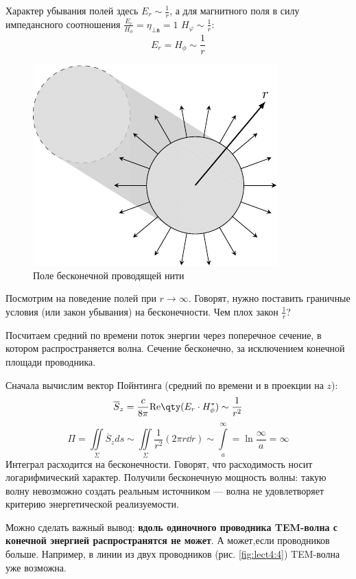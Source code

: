 Характер убывания полей здесь $E_r\sim \frac{1}{r}$, а для магнитного поля в силу импедансного соотношения $\frac{E_r}{H_\phi}=\eta_{\perp\text{в}}=1$ $H_\varphi\sim\frac{1}{r}$:
\begin{equation}
	E_r=H_\phi\sim\frac{1}{r}
\end{equation}
\begin{figure}[h!]
	\centering
	\includegraphics[scale=1.5]{img/lect4_ris3}
	\caption{Поле бесконечной проводящей нити}
	\label{fig:lect4:3}
\end{figure}

Посмотрим на поведение полей при $r\to\infty$. Говорят, нужно поставить граничные условия (или закон убывания) на бесконечности. Чем плох закон $\frac{1}{r}$?

Посчитаем средний по времени поток энергии через поперечное сечение, в котором распространяется волна. Сечение бесконечно, за исключением конечной площади проводника.

Сначала вычислим вектор Пойнтинга (средний по времени и в проекции на $z$):
\begin{equation}
	\overline{S}_z=\frac{c}{8 \pi}\mathrm{Re}\qty(E_r\cdot H_\phi^*)\sim\frac{1}{r^2}
\end{equation}
\begin{equation}
	\Pi=\iint\limits_\Sigma \overline{S}_z ds \sim
	\iint\limits_\Sigma \frac{1}{r^2} (2\pi r \dd{r})
	\sim \int\limits_a^\infty = \ln\frac{\infty}{a}=\infty
\end{equation}
Интеграл расходится на бесконечности. Говорят, что расходимость носит логарифмический характер. Получили бесконечную мощность волны: такую волну невозможно создать реальным источником --- волна не удовлетворяет критерию энергетической реализуемости.

Можно сделать важный вывод: \textbf{вдоль одиночного проводника TEM-волна с конечной энергией распространятся не может}. А может,если проводников больше. Например, в линии из двух проводников (рис. \ref{fig:lect4:4}) TEM-волна уже возможна.

